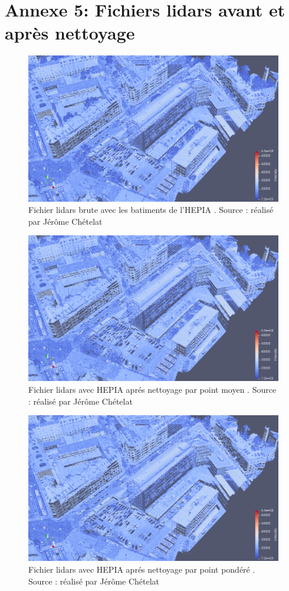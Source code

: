 \chapter*{Annexe 5: Fichiers lidars avant et après nettoyage}

\begin{figure}[htbp!]
    \centering
	\includegraphics[width=0.8\linewidth]{figures/hepia_las_before_filter.png}
	\caption{Fichier lidars brute avec les batiments de l'HEPIA . Source : réalisé par Jérôme Chételat}
	\label{fig:lidar_bef_filt}
\end{figure}

\begin{figure}[htbp!]
    \centering
	\includegraphics[width=0.8\linewidth]{figures/hepia_las_after_filter_avg.png}
	\caption{Fichier lidars avec HEPIA aprés nettoyage par point moyen . Source : réalisé par Jérôme Chételat}
	\label{fig:lidar_aft_filt_avg}
\end{figure}

\begin{figure}[htbp!]
    \centering
	\includegraphics[width=0.8\linewidth]{figures/hepia_las_after_filter_pond.png}
	\caption{Fichier lidars avec HEPIA aprés nettoyage par point pondéré . Source : réalisé par Jérôme Chételat}
	\label{fig:lidar_aft_filt_pond}
\end{figure}

